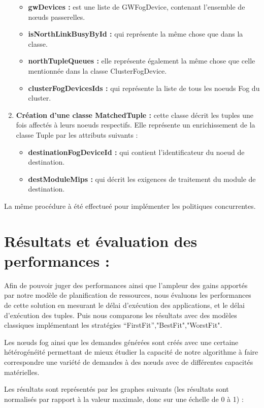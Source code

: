 \begin{enumerate}
\begin{itemize}
     \item \textbf{gwDevices :} est une liste de GWFogDevice, contenant l'ensemble de nœuds passerelles.
     \item \textbf{isNorthLinkBusyById :} qui représente la même chose que dans la classe.
     \item \textbf{northTupleQueues :} elle représente également la même chose que celle mentionnée dans la classe ClusterFogDevice.
     \item \textbf{clusterFogDevicesIds :} qui représente la liste de tous les noeuds Fog du cluster.
     \end{itemize}
     \item \textbf{Création d'une classe MatchedTuple :} cette classe décrit les tuples une fois affectés à leurs noeuds respectifs. Elle représente un enrichissement de la classe Tuple par les attributs suivants :
     \begin{itemize}
         \item \textbf{destinationFogDeviceId :} qui contient l'identificateur du noeud de destination.
         \item \textbf{destModuleMips :} qui décrit les exigences de traitement du module de destination.
     \end{itemize}
\end{enumerate}
La même procédure à été effectueé pour implémenter les politiques concurrentes.

\section{Résultats et évaluation des performances :}
Afin de pouvoir juger des performances ainsi que l'ampleur des gains apportés par notre modèle de planification de ressources, nous évaluons les performances de cette solution en mesurant le délai d'exécution des applications, et le délai d'exécution des tuples. Puis nous comparons les résultats avec des modèles classiques implémentant les stratégies “FirstFit”,"BestFit","WorstFit".\par
Les nœuds fog ainsi que les demandes générées sont créés avec une certaine hétérogénéité permettant de mieux étudier la capacité de notre algorithme à faire correspondre une variété de demandes à des nœuds avec de différentes capacités matérielles.\par
Les résultats sont représentés par les graphes suivants (les résultats sont normalisés par rapport à la valeur maximale, donc sur une échelle de 0 à 1) :

